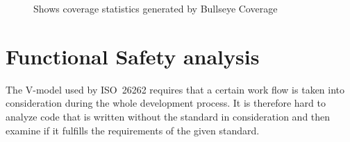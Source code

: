 \begin{figure}[!ht]
  \setlength\fboxsep{0pt}
  \setlength\fboxrule{0.5pt}
  \caption{Shows coverage statistics generated by Bullseye Coverage}
  \label{FIG:BULLSEYE}
\end{figure}


\section{Functional Safety analysis}
The V-model used by ISO~26262 requires that a certain work flow is
taken into consideration during the whole development process. %
It is therefore hard to analyze code that is written without the standard in
consideration and then examine if it fulfills the requirements of the given
standard.

